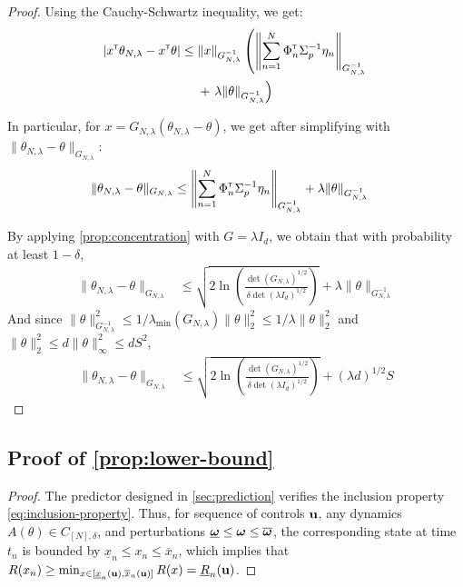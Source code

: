 \begin{subappendices}
\begin{proof}
		Using the Cauchy-Schwartz inequality, we get:
		\begin{align*}
		|x^{\mathsf{\scriptscriptstyle T}}\theta_{N,\lambda}  -x^{\mathsf{\scriptscriptstyle T}}\theta| \leq {} & \|x\|_{G_{N, \lambda}^{-1}}\left(\left\|\sum_{n=1}^N \Phi_n^{\mathsf{\scriptscriptstyle T}} \Sigma_p^{-1}\eta_n\right\|_{G_{N, \lambda}^{-1}}\right.\\ 
		&+ \left.\lambda\|\theta\|_{G_{N, \lambda}^{-1}}\right)
		\end{align*}
		
		In particular, for $x = G_{N,\lambda}(\theta_{N,\lambda} - \theta)$, we get after simplifying with $\| \theta_{N,\lambda}  - \theta\|_{G_{N,\lambda}}$:
		\begin{align*}
		\| \theta_{N,\lambda}  - \theta\|_{G_{N,\lambda}} &\leq \left\|\sum_{n=1}^N \Phi_n^{\mathsf{\scriptscriptstyle T}} \Sigma_p^{-1}\eta_n\right\|_{G_{N, \lambda}^{-1}} + \lambda\|\theta\|_{G_{N, \lambda}^{-1}}
		\end{align*}
		
		By applying \autoref{prop:concentration} with $G=\lambda I_d$, we obtain that with probability at least $1-\delta$,
		\begin{align*}
		\| \theta_{N,\lambda}  - \theta\|_{G_{N,\lambda}} &\leq \sqrt{2\ln \left(\frac{\det(G_{N,\lambda})^{1/2}}{\delta\det(\lambda I_d)^{1/2}}\right)}
		+ \lambda\|\theta\|_{G_{N, \lambda}^{-1}}
		\end{align*}
		And since $\|\theta\|_{G_{N, \lambda}^{-1}}^2 \leq 1/\lambda_{\min}(G_{N,\lambda})\|\theta\|_2^2 \leq 1/\lambda \|\theta\|_2^2$ and $\|\theta\|_2^2 \leq d\|\theta\|_\infty^2\leq d S^2$,
		\begin{align*}
		\| \theta_{N,\lambda}  - \theta\|_{G_{N,\lambda}} &\leq \sqrt{2\ln \left(\frac{\det(G_{N,\lambda})^{1/2}}{\delta\det(\lambda I_d)^{1/2}}\right)}
		+ (\lambda d)^{1/2}S
		\end{align*}
	\end{proof}
	
	
	\subsection{Proof of \autoref{prop:lower-bound}}
	
	\begin{proof}
		The predictor designed in \autoref{sec:prediction} verifies the inclusion property \eqref{eq:inclusion-property}. Thus, for sequence of controls $\mathbf{u}$, any dynamics $A(\theta)\in C_{[N],\delta}$, and perturbations $\underline{\bm{\omega}} \leq \bm{\omega} \leq \overline{\bm{\omega}}$, the corresponding state at time $t_n$ is bounded by $\underline{x}_n \leq x_n \leq \overline{x}_n$, which implies that $R(x_n) \geq \min_{x\in[\underline{x}_n(\mathbf{u}), \overline{x}_n(\mathbf{u})]}  R(x) = \underline{R}_n(\mathbf{u})$.
		

\end{proof}
\end{subappendices}
